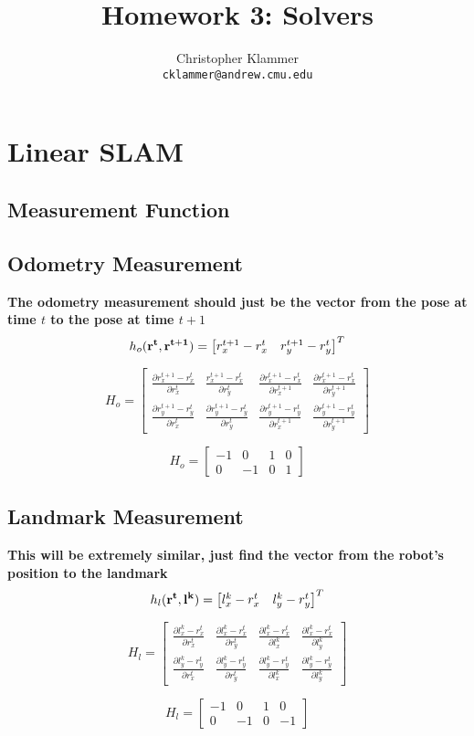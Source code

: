 \documentclass[12pt, a4paper]{article}
\title{Homework 3: Solvers}
\author{Christopher Klammer \\ \small\texttt{cklammer@andrew.cmu.edu}}
\begin{document}
\maketitle
\section{Linear SLAM}
\subsection{Measurement Function}
\subsection{Odometry Measurement}
\textbf{The odometry measurement should just be the vector from the pose at time $t$ to the pose at time $t+1$}
$$h_{o}(\vectorbold{r^t}, \vectorbold{r^{t+1}}) = 
\begin{bmatrix} r^{t+1}_x - r^t_x  & r^{t+1}_y - r^t_y \end{bmatrix}^T$$ 

$$H_{o} = \begin{bmatrix}
    \frac{\partial r^{t+1}_x - r^t_x}{\partial r^t_x} & \frac{r^{t+1}_x - r^t_x}{\partial r^t_y}& \frac{\partial r^{t+1}_x - r^t_x}{\partial r^{t+1}_{x}} & \frac{\partial r^{t+1}_x - r^t_x}{\partial r_y^{t+1}} \\
    \frac{\partial r^{t+1}_y - r^t_y}{\partial r^t_x} & \frac{\partial r^{t+1}_y - r^t_y}{\partial r^t_y}& \frac{\partial r^{t+1}_y - r^t_y}{\partial r^{t+1}_{x}} & \frac{\partial r^{t+1}_y - r^t_y}{\partial r_y^{t+1}}
\end{bmatrix}$$

$$H_{o} = \begin{bmatrix}
    -1 & 0 & 1 & 0 \\
    0 & -1 & 0 & 1
\end{bmatrix}$$

\subsection{Landmark Measurement}
\textbf{This will be extremely similar, just find the vector from the robot's position to the landmark}
$$h_{l}(\vectorbold{r^t}, \vectorbold{l^k}) = 
\begin{bmatrix} l^k_x - r^t_x  & l^k_y - r^t_y \end{bmatrix}^T$$


$$H_l = \begin{bmatrix}
    \frac{\partial l^k_x - r^t_x}{\partial r^t_x} & \frac{\partial l^k_x - r^t_x}{\partial r^t_y} & \frac{\partial l^k_x - r^t_x}{\partial l^k_x} & \frac{\partial l^k_x - r^t_x}{\partial l^k_y} \\
    \frac{\partial l^k_y - r^t_y }{\partial r^t_x} & \frac{\partial l^k_y - r^t_y }{\partial r^t_y} & \frac{\partial l^k_y - r^t_y }{\partial l^k_x} & \frac{\partial l^k_y - r^t_y }{\partial l^k_y}
\end{bmatrix}$$

$$H_l = \begin{bmatrix}
    -1 & 0 & 1 & 0 \\
    0  & -1 & 0 & -1
\end{bmatrix}$$
\end{document}
